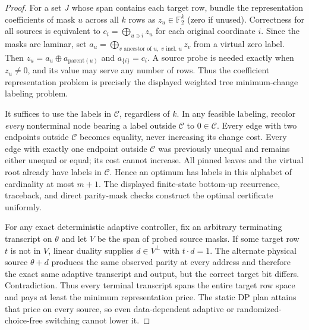 \documentclass[11pt]{article}
\newcommand{\F}{\mathbb F_2}
\begin{document}
\begin{proof}
For a set $J$ whose span contains each target row, bundle the representation coefficients of mask $u$ across all $k$ rows as $z_u\in\F^k$ (zero if unused). Correctness for all sources is equivalent to $c_i=\bigoplus_{u\ni i}z_u$ for each original coordinate $i$. Since the masks are laminar, set $a_u=\bigoplus_{v\text{ ancestor of }u,\;v\text{ incl. }u}z_v$ from a virtual zero label. Then $z_u=a_u\oplus a_{\mathrm{parent}(u)}$ and $a_{\{i\}}=c_i$. A source probe is needed exactly when $z_u\ne0$, and its value may serve any number of rows. Thus the coefficient representation problem is precisely the displayed weighted tree minimum-change labeling problem.

It suffices to use the labels in $\mathcal C$, regardless of $k$. In any feasible labeling, recolor \emph{every} nonterminal node bearing a label outside $\mathcal C$ to $0\in\mathcal C$. Every edge with two endpoints outside $\mathcal C$ becomes equality, never increasing its change cost. Every edge with exactly one endpoint outside $\mathcal C$ was previously unequal and remains either unequal or equal; its cost cannot increase. All pinned leaves and the virtual root already have labels in $\mathcal C$. Hence an optimum has labels in this alphabet of cardinality at most $m+1$. The displayed finite-state bottom-up recurrence, traceback, and direct parity-mask checks construct the optimal certificate uniformly.

For any exact deterministic adaptive controller, fix an arbitrary terminating transcript on $\theta$ and let $V$ be the span of probed source masks. If some target row $t$ is not in $V$, linear duality supplies $d\in V^\perp$ with $t\cdot d=1$. The alternate physical source $\theta+d$ produces the same observed parity at every address and therefore the exact same adaptive transcript and output, but the correct target bit differs. Contradiction. Thus every terminal transcript spans the entire target row space and pays at least the minimum representation price. The static DP plan attains that price on every source, so even data-dependent adaptive or randomized-choice-free switching cannot lower it.
\end{proof}
\end{document}
